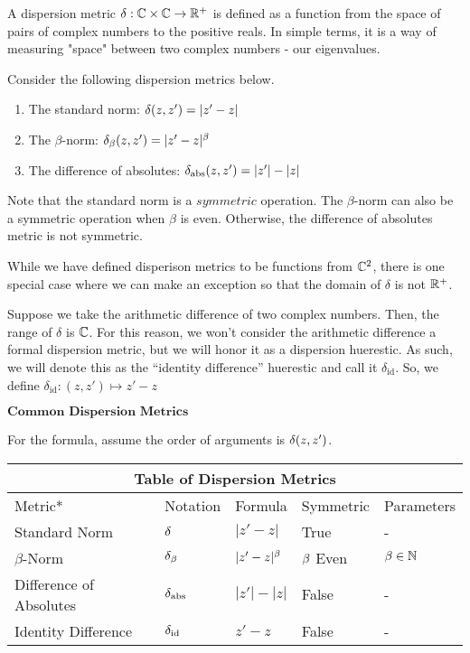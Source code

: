 \begin{definition}
A dispersion metric $\delta: \mathbb{C} \times \mathbb{C} \to \mathbb{R}^+$ is defined as a function from the space of pairs of complex numbers to the positive reals. In simple terms, it is a way of measuring "space" between two complex numbers - our eigenvalues.
\end{definition}

Consider the following dispersion metrics below.

\begin{enumerate}
\item The standard norm: $\delta(z,z') = |z' - z|$
\item The $\beta$-norm: $\delta_\beta(z,z') = |z' - z|^\beta$
\item The difference of absolutes: $\delta_{\text{abs}}(z,z') = |z'| - |z|$
\end{enumerate}

\begin{remark}
Note that the standard norm is a $\textit{symmetric}$ operation. The $\beta$-norm can also be a symmetric operation when $\beta$ is even. Otherwise, the difference of absolutes metric is not symmetric.
\end{remark}

While we have defined disperison metrics to be functions from $\mathbb{C}^2$, there is one special case where we can make an exception so that the domain of $\delta$ is not $\mathbb{R}^+$. 

\begin{remark}
Suppose we take the arithmetic difference of two complex numbers. Then, the range of $\delta$ is $\mathbb{C}$. For this reason, we won't consider the arithmetic difference a formal dispersion metric, but we will honor it as a dispersion huerestic. As such, we will denote this as the ``identity difference'' huerestic and call it $\delta_{\text{id}}$. So, we define $\delta_{\text{id}}: (z, z') \mapsto z' - z$
\end{remark}

\begin{center}
$\textbf{Common Dispersion Metrics}$
\end{center}

For the formula, assume the order of arguments is $\delta(z, z')$. \newline

\begin{tabular}{ |p{4.5cm}||p{2cm}|p{2cm}|p{2cm}|p{2cm}|  }
 \hline
 \multicolumn{5}{|c|}{Table of Dispersion Metrics} \\
 \hline
 Metric* & Notation & Formula & Symmetric & Parameters\\
 \hline
 Standard Norm & $\delta$ & $|z' - z|$ &  True & - \\
 $\beta$-Norm & $\delta_\beta$ & $|z' - z|^\beta$ & $\beta$ Even & $\beta \in \mathbb{N}$ \\
 Difference of Absolutes & $\delta_{\text{abs}}$ & $|z'| - |z|$ &  False  &  - \\
 Identity Difference &  $\delta_{\text{id}}$ & $z' - z$ & False &  - \\
 \hline
\end{tabular}

